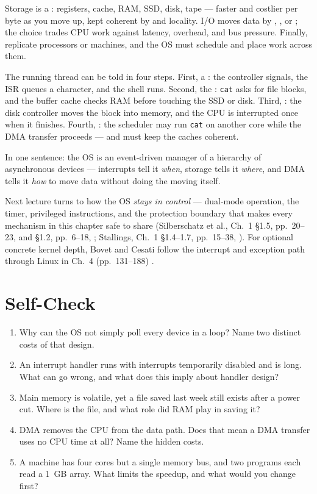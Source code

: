 \documentclass[11pt]{article}
\begin{document}
Storage is a : registers, cache, RAM, SSD, disk, tape --- faster and costlier per byte as you move up, kept coherent by  and locality. I/O moves data by , , or ; the choice trades CPU work against latency, overhead, and bus pressure. Finally,  replicate processors or machines, and the OS must schedule and place work across them.

The running thread can be told in four steps. First, a : the controller signals, the ISR queues a character, and the shell runs. Second, the : \texttt{cat} asks for file blocks, and the buffer cache checks RAM before touching the SSD or disk. Third, : the disk controller moves the block into memory, and the CPU is interrupted once when it finishes. Fourth, : the scheduler may run \texttt{cat} on another core while the DMA transfer proceeds --- and must keep the caches coherent.

In one sentence: the OS is an event-driven manager of a hierarchy of asynchronous devices --- interrupts tell it \emph{when}, storage tells it \emph{where}, and DMA tells it \emph{how} to move data without doing the moving itself.

Next lecture turns to how the OS \emph{stays in control} --- dual-mode operation, the timer, privileged instructions, and the protection boundary that makes every mechanism in this chapter safe to share (Silberschatz et al., Ch.~1 \S1.5, pp.~20--23, and \S1.2, pp.~6--18, \cite{SilberschatzOSC_operating_system_concepts}; Stallings, Ch.~1 \S1.4--1.7, pp.~15--38, \cite{StallingsOS_internals_design_principles}). For optional concrete kernel depth, Bovet and Cesati follow the interrupt and exception path through Linux in Ch.~4 (pp.~131--188) \cite{BovetCesati_understanding_linux_kernel}.

\section*{Self-Check}

\begin{enumerate}
  \item Why can the OS not simply poll every device in a loop? Name two distinct costs of that design.
  \item An interrupt handler runs with interrupts temporarily disabled and is long. What can go wrong, and what does this imply about handler design?
  \item Main memory is volatile, yet a file saved last week still exists after a power cut. Where is the file, and what role did RAM play in saving it?
  \item DMA removes the CPU from the data path. Does that mean a DMA transfer uses no CPU time at all? Name the hidden costs.
  \item A machine has four cores but a single memory bus, and two programs each read a 1~GB array. What limits the speedup, and what would you change first?
\end{enumerate}
\end{document}
